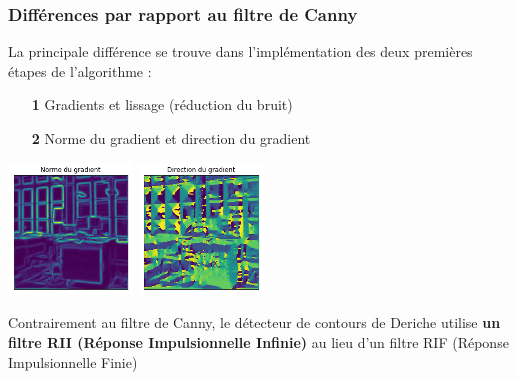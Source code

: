 \documentclass{beamer}
\begin{document}
\begin{frame}
\frametitle{Différences par rapport au filtre de Canny}
La principale différence se trouve dans l'implémentation des deux premières étapes de l'algorithme :
\begin{itemize}
\item[\textbf{1}] Gradients et lissage (réduction du bruit)
\item[\textbf{2}] Norme du gradient et direction du gradient
\end{itemize}

\centerline{\includegraphics[height=3.5cm]{Images/Python/norme_gradient} \includegraphics[height=3.5cm]{Images/Python/direction_gradient}}

Contrairement au filtre de Canny, le détecteur de contours de Deriche utilise \textbf{un filtre RII (Réponse Impulsionnelle Infinie)} au lieu d'un filtre RIF (Réponse Impulsionnelle Finie)

\end{frame}
\end{document}
